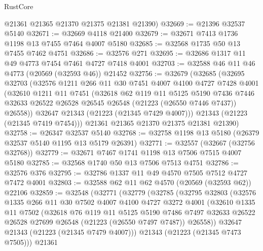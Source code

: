 \begin{lexlean}{RustCore}
\begin{coremodule}
      @21361
      @21365
      @21370
      @21375
      @21381
      @21390)
@32669 := @21396 @32537 @5140
@32671 := @32669 @4118 @21400
@32679 := @32671 @7413 @1736 @1198 @13 @7455 @7464 @4007 @5180
@32685 := @32568 @1735 @50 @13 @7455 @7462 @4751
@32686 := @32576 @271
@32695 := @32686 @1317 @11 @49 @4773 @7454 @7461 @4727 @7418 @4001
@32703 := @32588 @46 @11 @46 @4773 (@20569 (@32593 @46)) @21452
@32756 := @32679
    (@32685
      (@32695
        @32703
        (@32576
          @1211
          @266
          @11
          @30
          @7451
          @4007
          @4100
          @4727
          @7428
          @4001
          (@32610
            @1211
            @11
            @7451
            (@32618
              @62
              @119
              @11
              @5125
              @5190
              @7436
              @7446
              @32633
              @26522
              @26528
              @26545
              @26548
              (@21223 (@26550 @7446 @7437))
              @26558))
          @32647
          @21343
          (@21223 (@21345 @7429 @4007)))
        @21343
        (@21223 (@21345 @7419 @7454)))
      @21361
      @21365
      @21370
      @21375
      @21381
      @21390)
@32758 := @26347 @32537 @5140
@32768 := @32758 @1198 @13 @5180 (@26379 @32537 @5140 @1195 @13 @5179 @26391)
@32771 := @32557 (@32667 (@32756 @32768))
@32779 := @32671 @7467 @1741 @1198 @13 @7506 @7515 @4007 @5180
@32785 := @32568 @1740 @50 @13 @7506 @7513 @4751
@32786 := @32576 @376
@32795 := @32786 @1337 @11 @49 @4570 @7505 @7512 @4727 @7472 @4001
@32803 := @32588 @62 @11 @62 @4570 (@20569 (@32593 @62)) @22106
@32859 := @32548
    (@32771
      (@32779
        (@32785
          (@32795
            @32803
            (@32576
              @1335
              @266
              @11
              @30
              @7502
              @4007
              @4100
              @4727
              @3272
              @4001
              (@32610
                @1335
                @11
                @7502
                (@32618
                  @76
                  @119
                  @11
                  @5125
                  @5190
                  @7486
                  @7497
                  @32633
                  @26522
                  @26528
                  @27699
                  @26548
                  (@21223 (@26550 @7497 @7487))
                  @26558))
              @32647
              @21343
              (@21223 (@21345 @7479 @4007)))
            @21343
            (@21223 (@21345 @7473 @7505)))
          @21361

\end{coremodule}
\end{lexlean}
